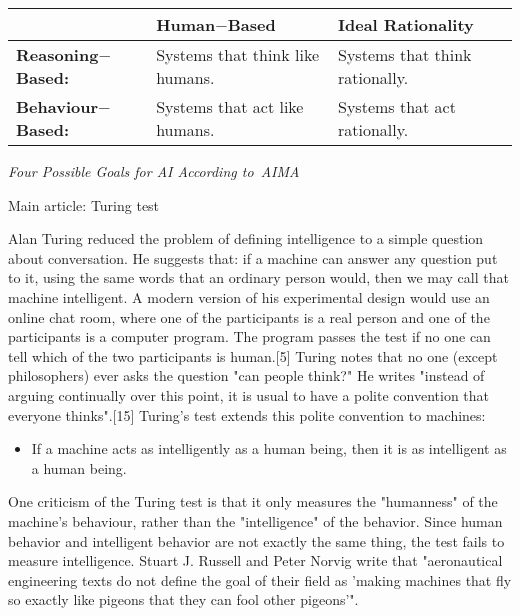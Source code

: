 \documentclass[12pt]{article}
\begin{document}
\begin{table}[H]
\begin{adjustbox}{max width=\textwidth}
\begin{tabular}{p{3.91cm}p{6.21cm}p{5.77cm}}
\hline
\multicolumn{1}{|p{3.91cm}}{} & 
\multicolumn{1}{|p{6.21cm}}{\textbf{\textcolor[HTML]{1A1A1A}{Human$-$Based}}} & 
\multicolumn{1}{|p{5.77cm}|}{\textbf{\textcolor[HTML]{1A1A1A}{Ideal Rationality}}} \\ 
\hline
\multicolumn{1}{|p{3.91cm}}{\textbf{\textcolor[HTML]{1A1A1A}{Reasoning$-$Based:}}} & 
\multicolumn{1}{|p{6.21cm}}{\textcolor[HTML]{1A1A1A}{Systems that think like humans.}} & 
\multicolumn{1}{|p{5.77cm}|}{\textcolor[HTML]{1A1A1A}{Systems that think rationally.}} \\ 
\hline
\multicolumn{1}{|p{3.91cm}}{\textbf{\textcolor[HTML]{1A1A1A}{Behaviour$-$Based:}}} & 
\multicolumn{1}{|p{6.21cm}}{\textcolor[HTML]{1A1A1A}{Systems that act like humans.}} & 
\multicolumn{1}{|p{5.77cm}|}{\textcolor[HTML]{1A1A1A}{Systems that act rationally.}} \\ 
\hline
\end{tabular}
\end{adjustbox}
\end{table}
\vspace{2\baselineskip}
\begin{center}
{\footnotesize \textit{\textcolor[HTML]{1A1A1A}{Four Possible Goals for AI According to}\textcolor[HTML]{1A1A1A}{ AIMA}}}
\end{center}


Main article: Turing test

Alan Turing reduced the problem of defining intelligence to a simple question about conversation. He suggests that: if a machine can answer any question put to it, using the same words that an ordinary person would, then we may call that machine intelligent. A modern version of his experimental design would use an online chat room, where one of the participants is a real person and one of the participants is a computer program. The program passes the test if no one can tell which of the two participants is human.[5] Turing notes that no one (except philosophers) ever asks the question "can people think?" He writes "instead of arguing continually over this point, it is usual to have a polite convention that everyone thinks".[15] Turing's test extends this polite convention to machines:

\begin{itemize}
	\item If a machine acts as intelligently as a human being, then it is as intelligent as a human being.

\end{itemize}
One criticism of the Turing test is that it only measures the "humanness" of the machine's behaviour, rather than the "intelligence" of the behavior. Since human behavior and intelligent behavior are not exactly the same thing, the test fails to measure intelligence. Stuart J. Russell and Peter Norvig write that "aeronautical engineering texts do not define the goal of their field as 'making machines that fly so exactly like pigeons that they can fool other pigeons'".
\end{document}
